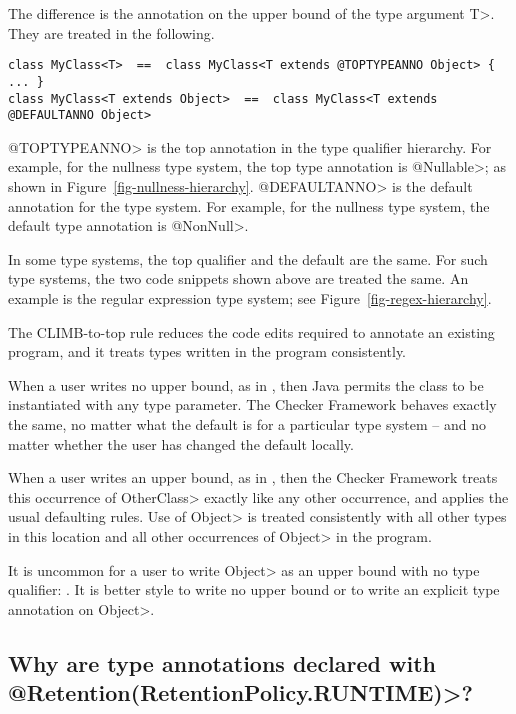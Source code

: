 The difference is the annotation on the upper bound of the type argument
\<T>.  They are treated in the following.

\begin{Verbatim}
class MyClass<T>  ==  class MyClass<T extends @TOPTYPEANNO Object> { ... }
class MyClass<T extends Object>  ==  class MyClass<T extends @DEFAULTANNO Object>
\end{Verbatim}

\noindent
\<@TOPTYPEANNO> is the top annotation in the type qualifier hierarchy.  For
example, for the nullness type system, the top type annotation is
\<@Nullable>; as shown in Figure~\ref{fig-nullness-hierarchy}.
\<@DEFAULTANNO> is the default annotation for the type system.  For
example, for the nullness type system, the default type annotation is
\<@NonNull>.

In some type systems, the top qualifier and the default are the same.  For
such type systems, the two code snippets shown above are treated the same.
An example is the regular expression type system; see
Figure~\ref{fig-regex-hierarchy}.

The CLIMB-to-top rule reduces the code edits required to annotate an
existing program, and it treats types written in the program consistently.

When a user writes no upper bound, as in
,
then Java permits the class to be instantiated with any type parameter.
The Checker Framework behaves exactly the same, no matter what the default
is for a particular type system -- and no matter whether the user has
changed the default locally.

When a user writes an upper bound, as in
,
then the Checker Framework treats this occurrence of \<OtherClass> exactly
like any other occurrence, and applies the usual defaulting rules.  Use of
\<Object> is treated consistently with all other types in this location and
all other occurrences of \<Object> in the program.

It is uncommon for a user to write \<Object> as an upper bound with no type
qualifier:
.
It is better style to write no upper bound or to write an explicit type
annotation on \<Object>.


\subsection{Why are type annotations declared with \<@Retention(RetentionPolicy.RUNTIME)>?\label{faq-runtime-retention}}

